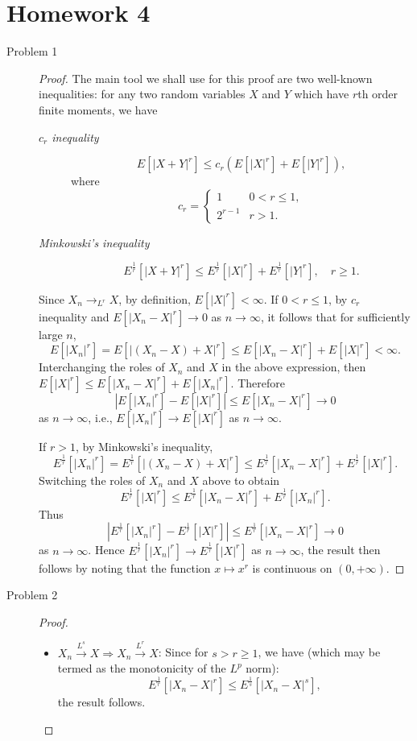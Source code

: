 \documentclass{article}
\theoremstyle{definition}
\theoremstyle{plain}
\theoremstyle{remark}
\begin{document}
\section*{Homework 4}
\begin{description}
\item[Problem 1]
\begin{proof}
The main tool we shall use for this proof are two well-known inequalities: for any two random variables $X$ and $Y$ which have $r$th order finite moments, we have
\begin{description}
\item[\emph{$c_r$ inequality}]
$$E[|X + Y|^r] \leq c_r(E[|X|^r] + E[|Y|^r]),$$
where 
$$c_r = 
\begin{cases}
1 & 0 < r \leq 1, \\[1ex]
2^{r - 1} & r > 1.
\end{cases}
$$

\item[\emph{Minkowski's inequality}]
$$E^{\frac{1}{r}}[|X + Y|^r] \leq E^{\frac{1}{r}}[|X|^r] + E^{\frac{1}{r}}[|Y|^r], \quad r \geq 1.$$
\end{description}

Since $X_n \to_{L^r} X$, by definition, $E[|X|^r] < \infty$. If $0 < r \leq 1$, by $c_r$ inequality and $E[|X_n - X|^r] \to 0$ as $n \to \infty$, it follows that for sufficiently large $n$, 
$$E[|X_n|^r] = E[|(X_n - X) + X|^r] \leq E[|X_n - X|^r] + E[|X|^r] < \infty.$$
Interchanging the roles of $X_n$ and $X$ in the above expression, then $E[|X|^r] \leq E[|X_n - X|^r] + E[|X_n|^r]$. Therefore
$$|E[|X_n|^r] - E[|X|^r]| \leq E[|X_n - X|^r] \to 0$$
as $n \to \infty$, i.e., $E[|X_n|^r] \to E[|X|^r]$ as $n \to \infty$. 

If $r > 1$, by Minkowski's inequality, 
$$E^{\frac{1}{r}}[|X_n|^r] = E^{\frac{1}{r}}[|(X_n - X) + X|^r] \leq E^{\frac{1}{r}}[|X_n - X|^r] + E^{\frac{1}{r}}[|X|^r].$$
Switching the roles of $X_n$ and $X$ above to obtain
$$E^{\frac{1}{r}}[|X|^r] \leq E^{\frac{1}{r}}[|X_n - X|^r] + E^{\frac{1}{r}}[|X_n|^r].$$
Thus
$$\left|E^{\frac{1}{r}}[|X_n|^r] - E^{\frac{1}{r}}[|X|^r]\right| \leq E^{\frac{1}{r}}[|X_n - X|^r] \to 0$$
as $n \to \infty$. Hence $E^{\frac{1}{r}}[|X_n|^r] \to E^{\frac{1}{r}}[|X|^r]$ as $n \to \infty$, the result then follows by noting that the function $x \mapsto x^r$ is continuous on $(0, +\infty)$.
\end{proof}

\item[Problem 2]
\begin{proof} \ 
\begin{itemize}
\item $X_n \overset{L^s}\to X \Rightarrow X_n \overset{L^r}\to X$: Since for $s > r \geq 1$, we have (which may be termed as the monotonicity of the $L^p$ norm):
$$E^{\frac{1}{r}}[|X_n - X|^r] \leq E^{\frac{1}{s}}[|X_n - X|^s],$$
the result follows. 


\end{itemize}
\end{proof}
\end{description}
\end{document}
